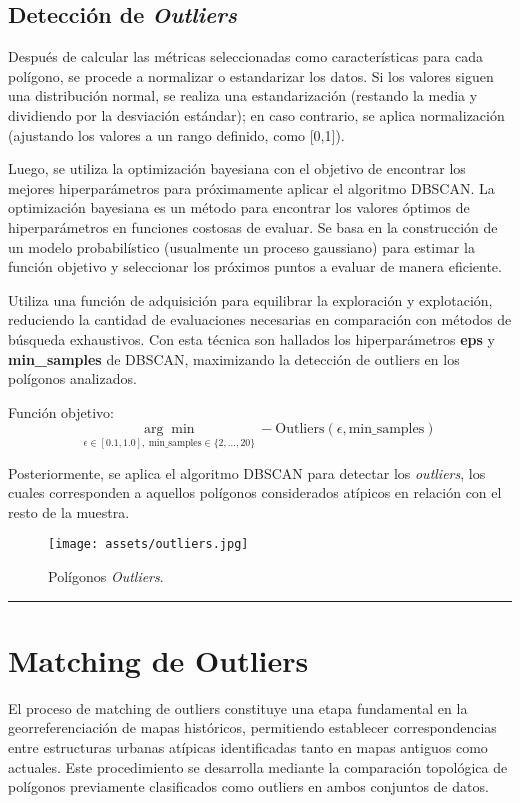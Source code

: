 \documentclass[twocolumn, fontsize=10pt]{article}
\begin{document}
\subsection{Detección de \textit{Outliers}}

Después de calcular las métricas seleccionadas como características para cada polígono, se procede a normalizar o estandarizar los datos. Si los valores siguen una distribución normal, se realiza una estandarización (restando la media y dividiendo por la desviación estándar); en caso contrario, se aplica normalización (ajustando los valores a un rango definido, como [0,1]).

Luego, se utiliza la optimización bayesiana con el objetivo de encontrar los mejores hiperparámetros para próximamente aplicar el algoritmo DBSCAN. La optimización bayesiana es un método para encontrar los valores óptimos de hiperparámetros en funciones costosas de evaluar. Se basa en la construcción de un modelo probabilístico (usualmente un proceso gaussiano) para estimar la función objetivo y seleccionar los próximos puntos a evaluar de manera eficiente. 

Utiliza una función de adquisición para equilibrar la 
exploración y explotación, reduciendo la cantidad de 
evaluaciones necesarias en comparación con métodos de 
búsqueda exhaustivos. Con esta técnica son hallados 
los hiperparámetros \textbf{eps} y \textbf{min\_samples} de DBSCAN, 
maximizando la detección de outliers en los polígonos 
analizados.

Función objetivo: \[
\underset{\epsilon \in [0.1, 1.0], \ \text{min\_samples} \in \{2, \dots, 20\}}{\arg\min} \ - \text{Outliers}(\epsilon, \text{min\_samples})
\]

Posteriormente, se aplica el algoritmo DBSCAN para 
detectar los \textit{outliers}, 
los cuales corresponden a aquellos polígonos 
considerados atípicos en relación con el resto de la 
muestra.

\begin{figure}[H]
    \centering
    \texttt{[image: assets/outliers.jpg]}
    \caption{Polígonos \textit{Outliers}.}
    \label{fig:poligonos_atipicos}
\end{figure}

\rule{\linewidth}{0.5pt}
\section{Matching de Outliers}

El proceso de matching de outliers constituye una etapa fundamental en la georreferenciación de mapas históricos, permitiendo establecer correspondencias entre estructuras urbanas atípicas identificadas tanto en mapas antiguos como actuales. Este procedimiento se desarrolla mediante la comparación topológica de polígonos previamente clasificados como outliers en ambos conjuntos de datos.
\end{document}

